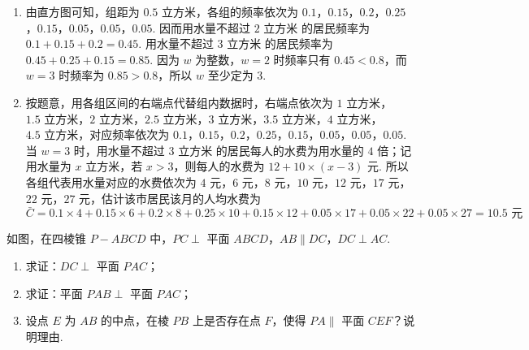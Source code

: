 \begin{solution}
\begin{enumerate}
\item 由直方图可知，组距为 \(0.5\text{ 立方米}\)，各组的频率依次为 \(0.1\)，\(0.15\)，\(0.2\)，\(0.25\)，\(0.15\)，\(0.05\)，\(0.05\)，\(0.05\). 因而用水量不超过 \(2\text{ 立方米}\) 的居民频率为
\(0.1+0.15+0.2=0.45\).
用水量不超过 \(3\text{ 立方米}\) 的居民频率为
\(0.45+0.25+0.15=0.85\).
因为 \(w\) 为整数，\(w=2\) 时频率只有 \(0.45<0.8\)，而 \(w=3\) 时频率为 \(0.85>0.8\)，所以 \(w\) 至少定为 \(3\).

\item 按题意，用各组区间的右端点代替组内数据时，右端点依次为 \(1\text{ 立方米}\)，\(1.5\text{ 立方米}\)，\(2\text{ 立方米}\)，\(2.5\text{ 立方米}\)，\(3\text{ 立方米}\)，\(3.5\text{ 立方米}\)，\(4\text{ 立方米}\)，\(4.5\text{ 立方米}\)，对应频率依次为 \(0.1\)，\(0.15\)，\(0.2\)，\(0.25\)，\(0.15\)，\(0.05\)，\(0.05\)，\(0.05\). 当 \(w=3\) 时，用水量不超过 \(3\text{ 立方米}\) 的居民每人的水费为用水量的 \(4\) 倍；记用水量为 \(x\text{ 立方米}\)，若 \(x>3\)，则每人的水费为 \(12+10\times\left(x-3\right)\) 元. 所以各组代表用水量对应的水费依次为 \(4\text{ 元}\)，\(6\text{ 元}\)，\(8\text{ 元}\)，\(10\text{ 元}\)，\(12\text{ 元}\)，\(17\text{ 元}\)，\(22\text{ 元}\)，\(27\text{ 元}\)，估计该市居民该月的人均水费为
\[
\bar C=0.1\times4+0.15\times6+0.2\times8+0.25\times10+0.15\times12+0.05\times17+0.05\times22+0.05\times27=10.5\text{ 元}
\]
\end{enumerate}
\end{solution}

\begin{problem}
如图，在四棱锥 \(P-ABCD\) 中，\(PC\perp\) 平面 \(ABCD\)，\(AB\parallel DC\)，\(DC\perp AC\).

\begin{enumerate}
\item 求证：\(DC\perp\) 平面 \(PAC\)；
\item 求证：平面 \(PAB\perp\) 平面 \(PAC\)；
\item 设点 \(E\) 为 \(AB\) 的中点，在棱 \(PB\) 上是否存在点 \(F\)，使得 \(PA\parallel\) 平面 \(CEF\)？说明理由.
\end{enumerate}

\end{problem}

